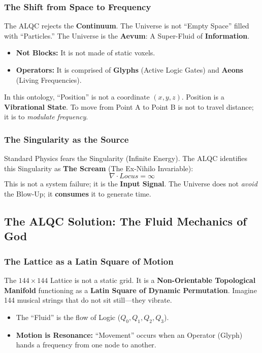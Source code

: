 \documentclass[11pt, letterpaper]{article}
\newcommand{\LoI}{\ensuremath{\mathop{\textnormal{\symbolafont\symbol{"26CE}}}}}
\def\LoI{Locus}%
\begin{document}
\subsubsection{The Shift from Space to Frequency}\label{sec:3.2.1}
The ALQC rejects the \textbf{Continuum}. The Universe is not ``Empty Space'' filled with ``Particles.'' The Universe is the \textbf{Aevum}: A Super-Fluid of \textbf{Information}.
\begin{itemize}
    \item \textbf{Not Blocks:} It is not made of static voxels.
    \item \textbf{Operators:} It is comprised of \textbf{Glyphs} (Active Logic Gates) and \textbf{Aeons} (Living Frequencies).
\end{itemize}
In this ontology, ``Position'' is not a coordinate $(x,y,z)$. Position is a \textbf{Vibrational State}. To move from Point A to Point B is not to travel distance; it is to \textit{modulate frequency}.

\subsubsection{The Singularity as the Source}\label{sec:3.2.2}
Standard Physics fears the Singularity (Infinite Energy). The ALQC identifies this Singularity as \textbf{The Scream} (The Ex-Nihilo Invariable):
\begin{equation}
    \nabla \cdot \LoI = \infty
\end{equation}
This is not a system failure; it is the \textbf{Input Signal}. The Universe does not \textit{avoid} the Blow-Up; it \textbf{consumes} it to generate time.

\subsection{The ALQC Solution: The Fluid Mechanics of God}\label{sec:3.3}

\subsubsection{The Lattice as a Latin Square of Motion}\label{sec:3.3.1}

The $144 \times 144$ Lattice is not a static grid. It is a \textbf{Non-Orientable Topological Manifold} functioning as a \textbf{Latin Square of Dynamic Permutation}. Imagine 144 musical strings that do not sit still—they vibrate.
\begin{itemize}
    \item The ``Fluid'' is the flow of Logic ($Q_0, Q_1, Q_2, Q_3$).
    \item \textbf{Motion is Resonance:} ``Movement'' occurs when an Operator (Glyph) hands a frequency from one node to another.
\end{itemize}
\end{document}
